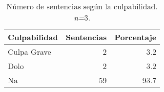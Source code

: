 \begin{table}[H]
\centering
\caption{Número de sentencias según la culpabilidad. \textit{n=}3.} 
\label{tab:culpabilidad}
\begin{tabular}{lrr}
  \hline
Culpabilidad & Sentencias & Porcentaje \\ 
  \hline
Culpa Grave &  2 & 3.2 \\ 
  Dolo &  2 & 3.2 \\ 
  Na & 59 & 93.7 \\ 
   \hline
\end{tabular}
\end{table}
